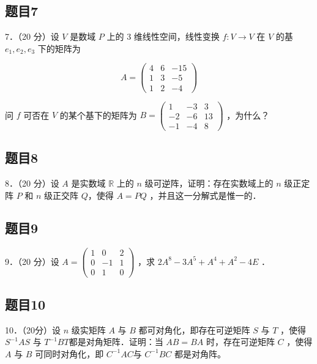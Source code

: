 \documentclass{article}
\begin{document}
\subsection{题目7}
7．（20 分）设 \(V\) 是数域 \(P\) 上的 3 维线性空间，线性变换 \(f: V \rightarrow V\) 在 \(V\) 的基 \(e_{1}, e_{2}, e_{3}\) 下的矩阵为

\[
A=\left(\begin{array}{lll}
4 & 6 & -15 \\
1 & 3 & -5 \\
1 & 2 & -4
\end{array}\right)
\]

问 \(f\) 可否在 \(V\) 的某个基下的矩阵为 \(B=\left(\begin{array}{ccc}1 & -3 & 3 \\ -2 & -6 & 13 \\ -1 & -4 & 8\end{array}\right)\) ，为什么？

\subsection{题目8}
8．（20 分）设 \(A\) 是实数域 \(\mathbb{R}\) 上的 \(n\) 级可逆阵，证明：存在实数域上的 \(n\) 级正定阵 \(P\) 和 \(n\) 级正交阵 \(Q\)，使得 \(A=P Q\) ，并且这一分解式是惟一的．

\subsection{题目9}
9．（20 分）设 \(A=\left(\begin{array}{ccc}1 & 0 & 2 \\ 0 & -1 & 1 \\ 0 & 1 & 0\end{array}\right)\) ，求 \(2 A^{8}-3 A^{5}+A^{4}+A^{2}-4 E\) ．

\subsection{题目10}
10．（20分）设 \(n\) 级实矩阵 \(A\) 与 \(B\) 都可对角化，即存在可逆矩阵 \(S\) 与 \(T\) ，使得 \(S^{-1} A S\) 与 \(T^{-1} B T\)都是对角矩阵．证明：当 \(A B=B A\) 时，存在可逆矩阵 \(C\) ，使得 \(A\) 与 \(B\) 可同时对角化，即 \(C^{-1} A C\)与 \(C^{-1} B C\) 都是对角阵。
\end{document}
